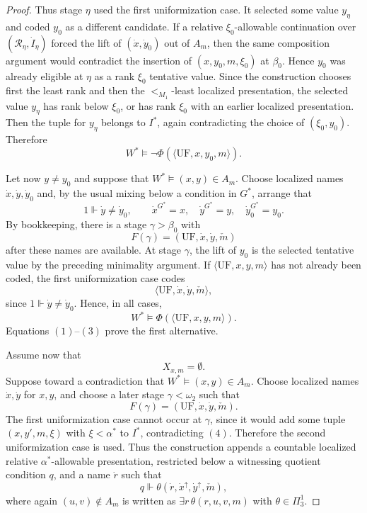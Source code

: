 \documentclass[a4paper,11pt]{article}
\begin{document}
\begin{proof}
Thus stage \(\eta\) used the first uniformization case.  It selected some value \(y_\eta\) and coded \(y_0\) as a different candidate.  If a relative \(\xi_0\)-allowable continuation over \((\mathcal R_\eta,\dot I_\eta)\) forced the lift of \((\dot x,\dot y_0)\) out of \(A_m\), then the same composition argument would contradict the insertion of \((x,y_0,m,\xi_0)\) at \(\beta_0\).  Hence \(y_0\) was already eligible at \(\eta\) as a rank \(\xi_0\) tentative value.  Since the construction chooses first the least rank and then the \(<_{M_1}\)-least localized presentation, the selected value \(y_\eta\) has rank below \(\xi_0\), or has rank \(\xi_0\) with an earlier localized presentation.  Then the tuple for \(y_\eta\) belongs to \(I^\ast\), again contradicting the choice of \((\xi_0,y_0)\).  Therefore
\[
   W^\ast\models \neg\Phi(\langle\mathrm{UF},x,y_0,m\rangle).       \tag{2}
\]

Let now \(y\ne y_0\) and suppose that \(W^\ast\models (x,y)\in A_m\).  Choose localized names \(\dot x,\dot y,\dot y_0\) and, by the usual mixing below a condition in \(G^\ast\), arrange that
\[
   1\Vdash \dot y\ne\dot y_0,
   \qquad
   \dot x^{G^\ast}=x,
   \quad
   \dot y^{G^\ast}=y,
   \quad
   \dot y_0^{G^\ast}=y_0.
\]
By bookkeeping, there is a stage \(\gamma>\beta_0\) with
\[
   F(\gamma)=(\mathrm{UF},\dot x,\dot y,\check m)
\]
after these names are available.  At stage \(\gamma\), the lift of \(y_0\) is the selected tentative value by the preceding minimality argument.  If \(\langle\mathrm{UF},x,y,m\rangle\) has not already been coded, the first uniformization case codes
\[
   \langle\mathrm{UF},\dot x,\dot y,\check m\rangle,
\]
since \(1\Vdash\dot y\ne\dot y_0\).  Hence, in all cases,
\[
   W^\ast\models \Phi(\langle\mathrm{UF},x,y,m\rangle).        \tag{3}
\]
Equations \((1)\)--\((3)\) prove the first alternative.

Assume now that
\[
   X_{x,m}=\emptyset .                                      \tag{4}
\]
Suppose toward a contradiction that \(W^\ast\models (x,y)\in A_m\).  Choose localized names \(\dot x,\dot y\) for \(x,y\), and choose a later stage \(\gamma<\omega_2\) such that
\[
   F(\gamma)=(\mathrm{UF},\dot x,\dot y,\check m).
\]
The first uniformization case cannot occur at \(\gamma\), since it would add some tuple \((x,y',m,\xi)\) with \(\xi<\alpha^\ast\) to \(I^\ast\), contradicting \((4)\).  Therefore the second uniformization case is used.  Thus the construction appends a countable localized relative \(\alpha^\ast\)-allowable presentation, restricted below a witnessing quotient condition \(q\), and a name \(\dot r\) such that
\[
   q\Vdash
      \theta(\dot r,
             \dot x^{\uparrow},
             \dot y^{\uparrow},
             \check m),                                      \tag{5}
\]
where again \((u,v)\notin A_m\) is written as \(\exists r\,\theta(r,u,v,m)\) with \(\theta\in\Pi^1_3\).


\end{proof}
\end{document}
